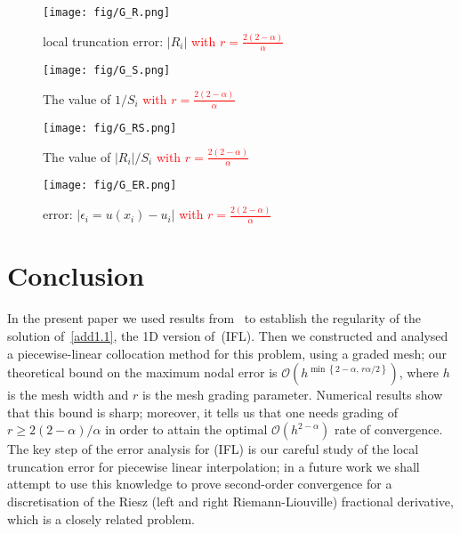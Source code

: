 \documentclass[smallextended]{svjour3}       %
\newcommand{\tcr}[1]{\textcolor{red}{#1}}
\begin{document}
\begin{figure}[!ht]
	\centering
	\begin{minipage}{0.49\linewidth}
		\centering
		\texttt{[image: fig/G\_R.png]}
		\caption{local truncation error: $\left|R_i\right|$ \tcr{with $r=\frac{2(2-\alpha)}{\alpha}$}}
		\label{RG}
	\end{minipage}
	\begin{minipage}{0.49\linewidth}
		\centering
		\texttt{[image: fig/G\_S.png]}
		\caption{The value of $1/S_i$ \tcr{with $r=\frac{2(2-\alpha)}{\alpha}$}}
		\label{SG}
	\end{minipage}
\qquad%
\begin{minipage}{0.49\linewidth}
		\centering
		\texttt{[image: fig/G\_RS.png]}
		\caption{The value of $\left|R_i\right|/S_i$ \tcr{with $r=\frac{2(2-\alpha)}{\alpha}$}}
		\label{RSG}
	\end{minipage}
	\begin{minipage}{0.49\linewidth}
		\centering
		\texttt{[image: fig/G\_ER.png]}
		\caption{error: $\left|\epsilon_{i}=u(x_i)-u_i \right|$ \tcr{with $r=\frac{2(2-\alpha)}{\alpha}$}}
		\label{EG}
	\end{minipage}
\end{figure}



\section{Conclusion}\label{sec:conclusion}
In the present paper we used results from~\cite{RosOtonSerra:14} to establish the regularity of the solution of~\eqref{add1.1}, the 1D version of~(IFL).
Then we constructed and analysed a piecewise-linear collocation method for this problem, using a graded mesh; our theoretical bound on the maximum nodal error is $\mathcal{O}\left(h^{\min\left\{2-\alpha,\,r\alpha/2\right\}}\right)$, where $h$ is the mesh width and $r$ is the mesh grading parameter.
 Numerical results show that this bound is sharp; moreover, it tells us that one needs grading of $r\ge 2(2-\alpha)/\alpha$ in order to attain the optimal $\mathcal{O}\left(h^{2-\alpha}\right)$ rate of convergence.
The key step of the error analysis for (IFL) is our careful study of the local truncation error for piecewise linear interpolation; 
in a future work we shall attempt to use this knowledge to prove second-order convergence for a discretisation of the Riesz (left and right Riemann-Liouville) fractional derivative, which is a closely related problem. 
\end{document}
